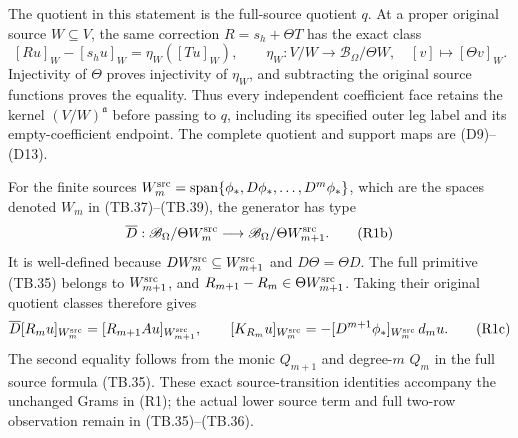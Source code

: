 The quotient in this statement is the full-source quotient $q$.
At a proper original source $W\subseteq V$, the same correction
$R=s_h+\Theta T$ has the exact class
\[
 [Ru]_W-[s_hu]_W=\eta_W([Tu]_W),\qquad
 \eta_W:V/W\longrightarrow\mathscr B_\Omega/\Theta W,
 \quad[v]\longmapsto[\Theta v]_W.
\tag{R1a}
\]
Injectivity of $\Theta$ proves injectivity of $\eta_W$, and
subtracting the original source functions proves the equality.
Thus every independent coefficient face retains the kernel
$(V/W)^{\mathfrak a}$ before passing to $q$, including its
specified outer leg label and its empty-coefficient endpoint.
The complete quotient and support maps are (D9)--(D13).

For the finite sources
$W_m^{\rm src}=\operatorname{span}\{\phi_*,D\phi_*,\ldots,D^m\phi_*\}$,
which are the spaces denoted $W_m$ in (TB.37)--(TB.39), the
generator has type
\[
\overline D:
 \mathscr B_\Omega/\Theta W_m^{\rm src}\longrightarrow
 \mathscr B_\Omega/\Theta W_{m+1}^{\rm src}.
\tag{R1b}
\]
It is well-defined because $DW_m^{\rm src}\subseteq W_{m+1}^{\rm src}$
and $D\Theta=\Theta D$.  The full primitive (TB.35) belongs to
$W_{m+1}^{\rm src}$, and $R_{m+1}-R_m\in\Theta W_{m+1}^{\rm src}$.
Taking their original quotient classes therefore gives
\[
 \overline D[R_mu]_{W_m^{\rm src}}
       =[R_{m+1}Au]_{W_{m+1}^{\rm src}},\qquad
 [K_{R_m}u]_{W_m^{\rm src}}
       =-[D^{m+1}\phi_*]_{W_m^{\rm src}}\,d_mu.
\tag{R1c}
\]
The second equality follows from the monic $Q_{m+1}$ and
degree-$m$ $Q_m$ in the full source formula (TB.35).
These exact source-transition identities accompany the unchanged
Grams in (R1); the actual lower source term and full two-row
observation remain in (TB.35)--(TB.36).
